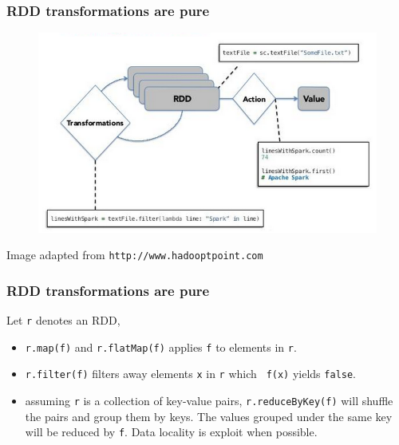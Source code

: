 \documentclass{beamer}
\begin{document}


\begin{frame}[fragile]
\frametitle{RDD transformations are pure}

\begin{figure}[!htb]
\centering
\includegraphics[scale=0.5]{pic/spark-rdd-partition-and-spark-rdd-architecture.png}
\end{figure}
Image adapted from {\tt http://www.hadooptpoint.com}

\end{frame}






\begin{frame}[fragile]
\frametitle{RDD transformations are pure}



Let {\tt r} denotes an RDD,
\begin{itemize}
\item {\tt r.map(f)} and {\tt r.flatMap(f)} applies {\tt f} to
  elements in {\tt r}.
\item {\tt r.filter(f)} filters away elements {\tt x} in {\tt r} which {\tt
    f(x)} yields {\tt false}.
\item assuming {\tt r} is a collection of key-value pairs, {\tt r.reduceByKey(f)} will
  shuffle the pairs and group them by keys. The values grouped under the same key will be
  reduced by {\tt f}. Data locality is exploit when possible.
\end{itemize}

\end{frame}
\end{document}
